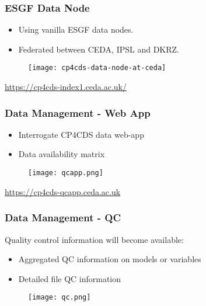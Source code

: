 \documentclass{beamer}
\begin{document}
\begin{frame}
\frametitle<presentation>{ESGF Data Node}

  \begin{itemize}
    \item Using vanilla ESGF data nodes.
    \item Federated between CEDA, IPSL and DKRZ.
  \end{itemize}

  \begin{figure}[ht]
    \centering
    \texttt{[image: cp4cds-data-node-at-ceda]}
  \end{figure}

  \centering
  \footnotesize{\url{https://cp4cds-index1.ceda.ac.uk/}}

\end{frame}

\begin{frame}
\frametitle<presentation>{Data Management - Web App}
  \begin{itemize}
    \item Interrogate CP4CDS data web-app
    \item Data availability matrix
  \end{itemize}

  \begin{figure}[ht]
    \centering
    \texttt{[image: qcapp.png]}
  \end{figure}

  \centering
  \footnotesize{\url{https://cp4cds-qcapp.ceda.ac.uk}}


\end{frame}

\begin{frame}
\frametitle<presentation>{Data Management - QC}
  Quality control information will become available:
  \begin{itemize}
    \item Aggregated QC information on models or variables
    \item Detailed file QC information
  \end{itemize}

  \begin{figure}[ht]
    \centering
    \texttt{[image: qc.png]}
  \end{figure}

\end{frame}
\end{document}
